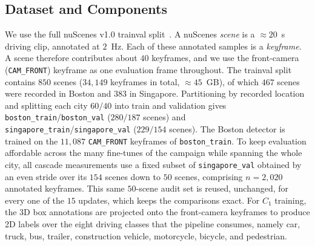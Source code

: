 \documentclass[conference]{IEEEtran}
\begin{document}
\subsection{Dataset and Components}
We use the full nuScenes v1.0 trainval split~\cite{caesar2020nuscenes}. A
nuScenes \emph{scene} is a $\approx 20$~s driving clip, annotated at $2$~Hz. Each
of these annotated samples is a \emph{keyframe}. A scene therefore contributes
about $40$ keyframes, and we use the front-camera (\texttt{CAM\_FRONT}) keyframe
as one evaluation frame throughout. The trainval split contains $850$ scenes
($34{,}149$ keyframes in total, $\approx 45$~GB), of which $467$ scenes were
recorded in Boston and $383$ in Singapore. Partitioning by recorded location and
splitting each city $60/40$ into train and validation gives
\texttt{boston\_train}/\texttt{boston\_val} ($280/187$ scenes) and
\texttt{singapore\_train}/\texttt{singapore\_val} ($229/154$ scenes). The Boston
detector is trained on the $11{,}087$ \texttt{CAM\_FRONT} keyframes of
\texttt{boston\_train}. To keep evaluation affordable across the many fine-tunes
of the campaign while spanning the whole city, all cascade measurements use a
fixed subset of \texttt{singapore\_val} obtained by an even stride over its $154$
scenes down to $50$ scenes, comprising $n=2{,}020$ annotated keyframes. This same
$50$-scene audit set is reused, unchanged, for every one of the $15$ updates, which
keeps the comparisons exact. For $C_1$ training, the 3D box annotations are
projected onto the front-camera keyframes to produce 2D labels over the eight
driving classes that the pipeline consumes, namely car, truck, bus, trailer,
construction vehicle, motorcycle, bicycle, and pedestrian.
\end{document}
